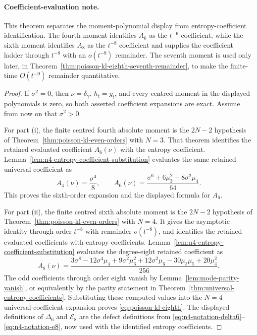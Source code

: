 \paragraph{Coefficient-evaluation note.}
This theorem separates the moment-polynomial display from entropy-coefficient
identification.  The fourth moment identifies \(A_6\) as the \(t^{-6}\)
coefficient, while the sixth moment identifies \(A_8\) as the \(t^{-8}\)
coefficient and supplies the coefficient ladder through \(t^{-8}\) with an
\(o(t^{-8})\) remainder.  The seventh moment is used only later, in
Theorem~\ref{thm:poisson-kl-eighth-seventh-remainder}, to make the finite-time
\(O(t^{-9})\) remainder quantitative.

\begin{proof}
If \(\sigma^2=0\), then \(\nu=\delta_{\bar{\gamma}}\), \(h_t=g_t\), and every
centred moment in the displayed polynomials is zero, so both asserted
coefficient expansions are exact.  Assume from now on that \(\sigma^2>0\).

For part \textup{(i)}, the finite centred fourth absolute moment is the
\(2N-2\) hypothesis of Theorem~\ref{thm:poisson-kl-even-orders} with
\(N=3\).  That theorem identifies the retained evaluated coefficient
\(A_6(\nu)\) with the entropy coefficient.  Lemma~\ref{lem:n4-entropy-coefficient-substitution}
evaluates the same retained universal coefficient as
\[
A_4(\nu)=\frac{\sigma^4}{8},\qquad
A_6(\nu)
=\frac{\sigma^6+6\mu_3^2-8\sigma^2\mu_4}{64}.
\]
This proves the sixth-order expansion and
the displayed formula for \(A_6\).

For part \textup{(ii)}, the finite centred sixth absolute moment is the
\(2N-2\) hypothesis of Theorem~\ref{thm:poisson-kl-even-orders} with
\(N=4\).  It gives the asymptotic identity through order \(t^{-8}\) with
remainder \(o(t^{-8})\), and identifies the retained evaluated coefficients
with entropy coefficients.  Lemma~\ref{lem:n4-entropy-coefficient-substitution}
evaluates the degree-eight retained coefficient as
\[
A_8(\nu)
=\frac{3\sigma^8-12\sigma^4\mu_4+9\sigma^2\mu_3^2
+12\sigma^2\mu_6-30\mu_3\mu_5+20\mu_4^2}{256}.
\]
The odd coefficients through order eight vanish by
Lemma~\ref{lem:mode-parity-vanish}, or equivalently by the parity statement
in Theorem~\ref{thm:universal-entropy-coefficients}.  Substituting these
computed values into the \(N=4\) universal-coefficient expansion proves
\eqref{eq:poisson-kl-eighth}.  The displayed definitions of
\(\Delta_6\) and \(\mathcal E_8\) are the defect definitions from
\eqref{eq:n4-notation-delta6}--\eqref{eq:n4-notation-e8}, now used with
the identified entropy coefficients.
\end{proof}

